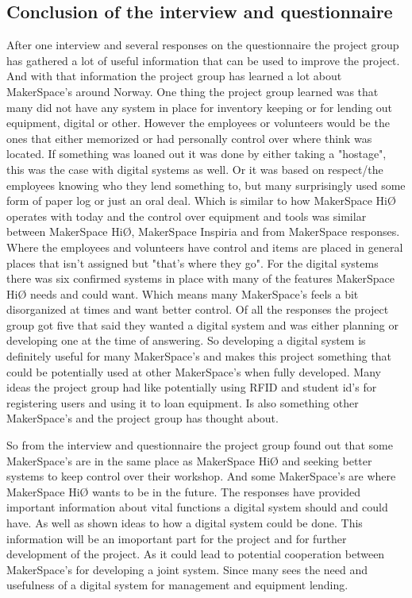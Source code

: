 \subsection{Conclusion of the interview and questionnaire}
After one interview and several responses on the questionnaire the project group has gathered a lot of useful information that can be used to improve the project. And with that information the project group has learned a lot about MakerSpace's around Norway. One thing the project group learned was that many did not have any system in place for inventory keeping or for lending out equipment, digital or other. However the employees or volunteers would be the ones that either memorized or had personally control over where think was located. If something was loaned out it was done by either taking a "hostage", this was the case with digital systems as well. Or it was based on respect/the employees knowing who they lend something to, but many surprisingly used some form of paper log or just an oral deal. Which is similar to how MakerSpace HiØ operates with today and the control over equipment and tools was similar between MakerSpace HiØ, MakerSpace Inspiria and from MakerSpace responses. Where the employees and volunteers have control and items are placed in general places that isn't assigned but "that's where they go". 
For the digital systems there was six confirmed systems in place with many of the features MakerSpace HiØ needs and could want. Which means many MakerSpace's feels a bit disorganized at times and want better control. Of all the responses the project group got five that said they wanted a digital system and was either planning or developing one at the time of answering. So developing a digital system is definitely useful for many MakerSpace's and makes this project something that could be potentially used at other MakerSpace's when fully developed. Many ideas the project group had like potentially using RFID and student id's for registering users and using it to loan equipment. Is also something other MakerSpace's and the project group has thought about. 

So from the interview and questionnaire the project group found out that some MakerSpace's are in the same place as MakerSpace HiØ and seeking better systems to keep control over their workshop. And some MakerSpace's are where MakerSpace HiØ wants to be in the future. The responses have provided important information about vital functions a digital system should and could have. As well as shown ideas to how a digital system could be done. This information will be an imoportant part for the project and for further development of the project. As it could lead to potential cooperation between MakerSpace's for developing a joint system. Since many sees the need and usefulness of a digital system for management and equipment lending.

